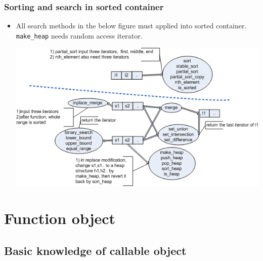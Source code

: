 \documentclass[a4paper,11pt,twoside]{book}
\begin{document}
\subsubsection{Sorting and search in sorted container}
\begin{itemize}
	\item All search methods in the below figure must applied into sorted container. \texttt{make\_heap} needs random access iterator.
	
	\begin{center}
	\includegraphics[width=0.9\linewidth]{pics/std4.png}
	\end{center}

\end{itemize}

\section{Function object}
\subsection{Basic knowledge of callable object}
\end{document}
